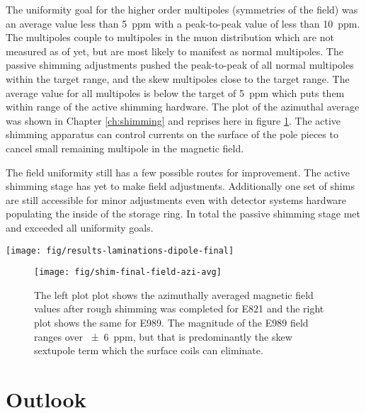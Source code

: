 The uniformity goal for the higher order multipoles (symmetries of the field) was an average value less than \SI{5}{ppm} with a peak-to-peak value of less than \SI{10}{ppm}.  The multipoles couple to multipoles in the muon distribution which are not measured as of yet, but are most likely to manifest as normal multipoles.  The passive shimming adjustments pushed the peak-to-peak of all normal multipoles within the target range, and the skew multipoles close to the target range.  The average value for all multipoles is below the target of \SI{5}{ppm} which puts them within range of the active shimming hardware.  The plot of the azimuthal average was shown in Chapter \ref{ch:shimming} and reprises here in figure \ref{fig:conclusion-azi-avg}.  The active shimming apparatus can control currents on the surface of the pole pieces to cancel small remaining multipole in the magnetic field.

The field uniformity still has a few possible routes for improvement.  The active shimming stage has yet to make field adjustments.  Additionally one set of shims are still accessible for minor adjustments even with \mugmtwo detector systems hardware populating the inside of the storage ring. In total the passive shimming stage met and exceeded all uniformity goals.

\begin{sidewaysfigure}
\centering
\texttt{[image: fig/results-laminations-dipole-final]}
\caption{The final rough shimming result for E989 in red compared with the PRD field plot for E821.  The horizontal bands indicate \SI{\pm 25}{ppm} around the central value which was target for E989.  The result field beat the target by a factor of two and E821 field results by a factor of three. \label{fig:conclusions-dipole-final}}
\end{sidewaysfigure}

\begin{figure}
\centering
\texttt{[image: fig/shim-final-field-azi-avg]}
\caption{
    The left plot plot shows the azimuthally averaged magnetic field values after rough shimming was completed for E821 and the right plot shows the same for E989.  The magnitude of the E989 field ranges over \SI{\pm 6}{ppm}, but that is predominantly the skew sextupole term which the surface coils can eliminate.
    \label{fig:conclusion-azi-avg}
}
\end{figure}

\section{Outlook}

